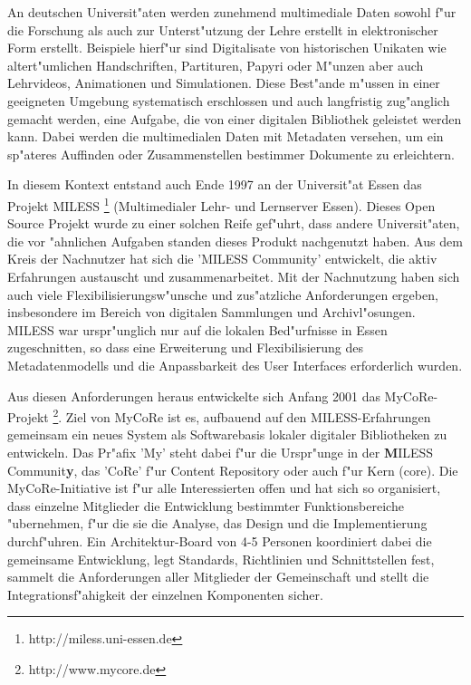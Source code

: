 An deutschen Universit"aten werden zunehmend multimediale Daten sowohl f"ur
die Forschung als auch zur Unterst"utzung der Lehre erstellt in elektronischer
Form erstellt.
Beispiele hierf"ur sind Digitalisate von historischen Unikaten wie
altert"umlichen Handschriften, Partituren, Papyri oder M"unzen
aber auch Lehrvideos, Animationen und Simulationen.
Diese Best"ande m"ussen in einer geeigneten Umgebung systematisch
erschlossen und auch langfristig zug"anglich gemacht werden, eine
Aufgabe, die von einer digitalen Bibliothek geleistet werden kann.
Dabei werden die multimedialen Daten mit Metadaten versehen, um ein 
sp"ateres Auffinden oder Zusammenstellen bestimmer Dokumente zu erleichtern.

In diesem Kontext entstand auch Ende 1997 an der Universit"at Essen
das Projekt MILESS \footnote{http://miless.uni-essen.de} (Multimedialer
Lehr- und Lernserver Essen).
Dieses Open Source Projekt wurde zu einer solchen Reife gef"uhrt, dass
andere Universit"aten, die vor "ahnlichen Aufgaben standen dieses Produkt
nachgenutzt haben.
Aus dem Kreis der Nachnutzer hat sich die 'MILESS Community' entwickelt,
die aktiv Erfahrungen austauscht und zusammenarbeitet.
Mit der Nachnutzung haben sich auch viele Flexibilisierungsw"unsche
und zus"atzliche Anforderungen ergeben, insbesondere im Bereich
von digitalen Sammlungen und Archivl"osungen.
MILESS war urspr"unglich nur auf die lokalen Bed"urfnisse in Essen
zugeschnitten, so dass eine Erweiterung und Flexibilisierung 
des Metadatenmodells und die Anpassbarkeit des User Interfaces 
erforderlich wurden.

Aus diesen Anforderungen heraus entwickelte sich Anfang 2001 das
MyCoRe-Projekt \footnote{http://www.mycore.de}. 
Ziel von MyCoRe ist es, aufbauend auf den MILESS-Erfahrungen gemeinsam
ein neues System als Softwarebasis lokaler digitaler Bibliotheken zu
entwickeln.
Das Pr"afix 'My' steht dabei f"ur die Urspr"unge in der {\bf M}ILESS
Communit{\bf y}, das 'CoRe' f"ur Content Repository oder auch f"ur
Kern (core).
Die MyCoRe-Initiative ist f"ur alle Interessierten offen und hat sich
so organisiert, dass einzelne Mitglieder die Entwicklung bestimmter
Funktionsbereiche "ubernehmen, f"ur die sie die Analyse, das Design und
die Implementierung durchf"uhren.
Ein Architektur-Board von 4-5 Personen koordiniert dabei die gemeinsame
Entwicklung, legt Standards, Richtlinien und Schnittstellen fest, sammelt
die Anforderungen aller Mitglieder der Gemeinschaft und stellt die 
Integrationsf"ahigkeit der einzelnen Komponenten sicher.

